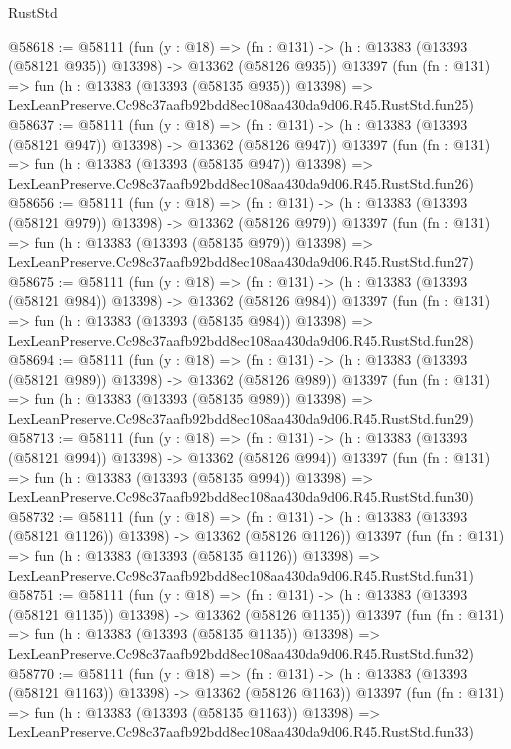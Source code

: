 \begin{lexlean}{RustStd}
\begin{coremodule}
@58618 := @58111
    (fun (y : @18) =>
    (fn : @131) -> (h : @13383 (@13393 (@58121 @935)) @13398) -> @13362 (@58126 @935))
    @13397
    (fun (fn : @131) =>
    fun (h : @13383 (@13393 (@58135 @935)) @13398) =>
    LexLeanPreserve.Cc98c37aafb92bdd8ec108aa430da9d06.R45.RustStd.fun25)
@58637 := @58111
    (fun (y : @18) =>
    (fn : @131) -> (h : @13383 (@13393 (@58121 @947)) @13398) -> @13362 (@58126 @947))
    @13397
    (fun (fn : @131) =>
    fun (h : @13383 (@13393 (@58135 @947)) @13398) =>
    LexLeanPreserve.Cc98c37aafb92bdd8ec108aa430da9d06.R45.RustStd.fun26)
@58656 := @58111
    (fun (y : @18) =>
    (fn : @131) -> (h : @13383 (@13393 (@58121 @979)) @13398) -> @13362 (@58126 @979))
    @13397
    (fun (fn : @131) =>
    fun (h : @13383 (@13393 (@58135 @979)) @13398) =>
    LexLeanPreserve.Cc98c37aafb92bdd8ec108aa430da9d06.R45.RustStd.fun27)
@58675 := @58111
    (fun (y : @18) =>
    (fn : @131) -> (h : @13383 (@13393 (@58121 @984)) @13398) -> @13362 (@58126 @984))
    @13397
    (fun (fn : @131) =>
    fun (h : @13383 (@13393 (@58135 @984)) @13398) =>
    LexLeanPreserve.Cc98c37aafb92bdd8ec108aa430da9d06.R45.RustStd.fun28)
@58694 := @58111
    (fun (y : @18) =>
    (fn : @131) -> (h : @13383 (@13393 (@58121 @989)) @13398) -> @13362 (@58126 @989))
    @13397
    (fun (fn : @131) =>
    fun (h : @13383 (@13393 (@58135 @989)) @13398) =>
    LexLeanPreserve.Cc98c37aafb92bdd8ec108aa430da9d06.R45.RustStd.fun29)
@58713 := @58111
    (fun (y : @18) =>
    (fn : @131) -> (h : @13383 (@13393 (@58121 @994)) @13398) -> @13362 (@58126 @994))
    @13397
    (fun (fn : @131) =>
    fun (h : @13383 (@13393 (@58135 @994)) @13398) =>
    LexLeanPreserve.Cc98c37aafb92bdd8ec108aa430da9d06.R45.RustStd.fun30)
@58732 := @58111
    (fun (y : @18) =>
    (fn : @131) -> (h : @13383 (@13393 (@58121 @1126)) @13398) -> @13362 (@58126 @1126))
    @13397
    (fun (fn : @131) =>
    fun (h : @13383 (@13393 (@58135 @1126)) @13398) =>
    LexLeanPreserve.Cc98c37aafb92bdd8ec108aa430da9d06.R45.RustStd.fun31)
@58751 := @58111
    (fun (y : @18) =>
    (fn : @131) -> (h : @13383 (@13393 (@58121 @1135)) @13398) -> @13362 (@58126 @1135))
    @13397
    (fun (fn : @131) =>
    fun (h : @13383 (@13393 (@58135 @1135)) @13398) =>
    LexLeanPreserve.Cc98c37aafb92bdd8ec108aa430da9d06.R45.RustStd.fun32)
@58770 := @58111
    (fun (y : @18) =>
    (fn : @131) -> (h : @13383 (@13393 (@58121 @1163)) @13398) -> @13362 (@58126 @1163))
    @13397
    (fun (fn : @131) =>
    fun (h : @13383 (@13393 (@58135 @1163)) @13398) =>
    LexLeanPreserve.Cc98c37aafb92bdd8ec108aa430da9d06.R45.RustStd.fun33)

\end{coremodule}
\end{lexlean}
